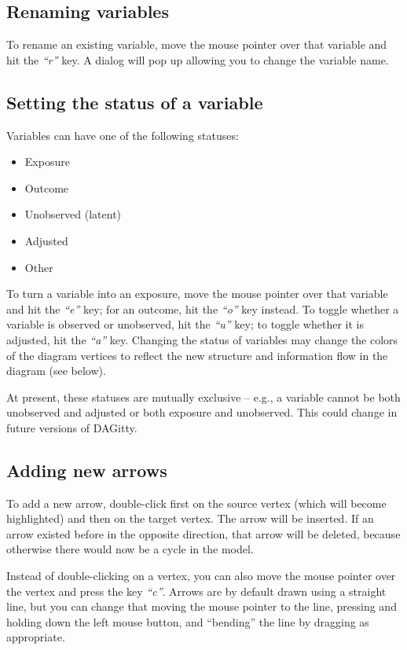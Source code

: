 \documentclass[a4paper,10pt]{article}
\newcommand{\pname}{{\sc DAG}itty\xspace}
\newcommand{\action}[1]{\emph{``#1''}}
\begin{document}
\subsection{Renaming variables}

To rename an existing variable, move the
mouse pointer over that variable and hit the \action{r} key. A dialog
will pop up allowing you to change the variable name.

\subsection{Setting the status of a variable}

Variables can have one of the following 
statuses:

\begin{itemize} 
\item Exposure
\item Outcome
\item Unobserved (latent)
\item Adjusted
\item Other
\end{itemize}


To turn a variable into an exposure, move the
mouse pointer over that variable and hit the \action{e} key; 
for an outcome, hit the \action{o} key instead.
To toggle whether a variable is observed or unobserved,
hit the \action{u} key; to toggle whether it is 
adjusted, hit the \action{a} key.
Changing the status of variables may change the 
colors of the diagram vertices to reflect the new structure 
and information flow in the diagram (see below). 

At present, these statuses are mutually exclusive --  e.g.,
a variable cannot be both unobserved and adjusted 
or both exposure and unobserved. This could change
in future versions of \pname.

\subsection{Adding new arrows}

To add a new arrow, double-click first on the source vertex 
(which will become highlighted) and then on the target vertex.
The arrow will be inserted. If an arrow existed before
in the opposite direction, that arrow will be deleted, because otherwise
there would now be a cycle in the model. 

Instead of double-clicking on a vertex, you can also move the mouse pointer
over the vertex and press the key \action{c}. Arrows are by default
drawn using a straight line,
but you can change that moving the mouse pointer to the line,
pressing and holding down the left mouse button, and ``bending''
the line by dragging as appropriate.
\end{document}
